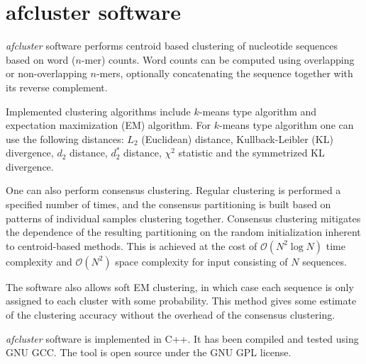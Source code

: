 \documentclass[12pt]{article}
\newcommand{\Oc}{\mathcal{O}}
\begin{document}
\section*{afcluster software}
\emph{afcluster} software performs centroid based clustering
of nucleotide sequences based on word ($n$-mer) counts.
Word counts can be computed using overlapping or non-overlapping $n$-mers,
optionally concatenating the sequence together with its reverse complement.

Implemented clustering algorithms include
$k$-means type algorithm and expectation maximization (EM) algorithm.
For $k$-means type algorithm one can use the following distances:
$L_2$ (Euclidean) distance, Kullback-Leibler (KL) divergence, $d_2$ distance,
$d_2^*$ distance, $\chi^2$ statistic and the symmetrized KL divergence. 

One can also perform consensus clustering.
Regular clustering is performed a specified number of times,
and the consensus partitioning is built based on patterns
of individual samples clustering together.
Consensus clustering mitigates the dependence of the resulting partitioning
on the random initialization inherent to centroid-based methods.
This is achieved at the cost of $\Oc(N^2 \log N)$ time complexity and $\Oc(N^2)$
space complexity for input consisting of $N$ sequences.

The software also allows soft EM clustering,
in which case each sequence is only assigned to each cluster with some probability.
This method gives some estimate of the clustering accuracy
without the overhead of the consensus clustering.

\emph{afcluster} software is implemented in C++.
It has been compiled and tested using GNU GCC.
The tool is open source under the GNU GPL license.
\end{document}
